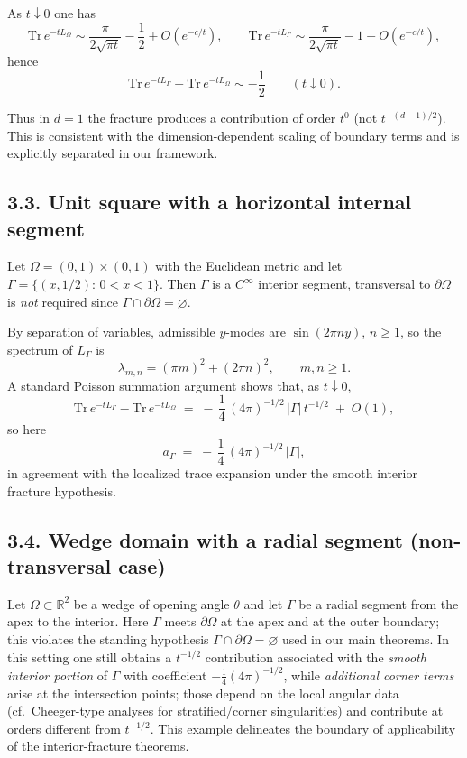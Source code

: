 \begin{proposition}\label{prop:1d-interval}
As $t\downarrow0$ one has
\[
\mathrm{Tr}\,e^{-tL_\Omega}\sim \frac{\pi}{2\sqrt{\pi t}}-\frac12+O(e^{-c/t}),\qquad
\mathrm{Tr}\,e^{-tL_\Gamma}\sim \frac{\pi}{2\sqrt{\pi t}}-1+O(e^{-c/t}),
\]
hence
\[
\mathrm{Tr}\,e^{-tL_\Gamma}-\mathrm{Tr}\,e^{-tL_\Omega}\sim -\frac12\qquad (t\downarrow0).
\]
\end{proposition}

\noindent
Thus in $d=1$ the fracture produces a contribution of order $t^{0}$ (not $t^{-(d-1)/2}$). This is consistent with the dimension-dependent scaling of boundary terms and is explicitly separated in our framework.

\subsection*{3.3. Unit square with a horizontal internal segment}
Let $\Omega=(0,1)\times(0,1)$ with the Euclidean metric and let $\Gamma=\{(x,1/2):\,0<x<1\}$. Then $\Gamma$ is a $C^\infty$ interior segment, transversal to $\partial\Omega$ is \emph{not} required since $\Gamma\cap\partial\Omega=\varnothing$.

By separation of variables, admissible $y$-modes are $\sin(2\pi n y)$, $n\ge1$, so the spectrum of $L_\Gamma$ is
\[
\lambda_{m,n}=(\pi m)^2+(2\pi n)^2,\qquad m,n\ge1.
\]
A standard Poisson summation argument shows that, as $t\downarrow0$,
\[
\mathrm{Tr}\,e^{-tL_\Gamma}-\mathrm{Tr}\,e^{-tL_\Omega}
\;=\; -\,\frac{1}{4}\,(4\pi)^{-1/2}\,|\Gamma|\,t^{-1/2}\;+\;O(1),
\]
so here
\[
a_\Gamma \;=\; -\,\frac{1}{4}\,(4\pi)^{-1/2}\,|\Gamma|,
\]
in agreement with the localized trace expansion under the smooth interior fracture hypothesis.

\subsection*{3.4. Wedge domain with a radial segment (non-transversal case)}
Let $\Omega\subset\mathbb{R}^2$ be a wedge of opening angle $\theta$ and let $\Gamma$ be a radial segment from the apex to the interior. Here $\Gamma$ meets $\partial\Omega$ at the apex and at the outer boundary; this violates the standing hypothesis $\Gamma\cap\partial\Omega=\varnothing$ used in our main theorems. In this setting one still obtains a $t^{-1/2}$ contribution associated with the \emph{smooth interior portion} of $\Gamma$ with coefficient $-\frac14(4\pi)^{-1/2}$, while \emph{additional corner terms} arise at the intersection points; those depend on the local angular data (cf.\ Cheeger-type analyses for stratified/corner singularities) and contribute at orders different from $t^{-1/2}$. This example delineates the boundary of applicability of the interior-fracture theorems.

